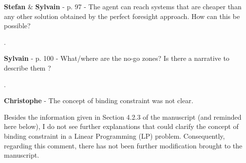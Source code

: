 \documentclass[12pt,a4paper]{article}
\begin{document}
\begin{mdframed}[style=comment] %
{\color{teal} \textbf{Stefan}} \& {\color{purple} \textbf{Sylvain}} - p. 97 - The agent can reach systems that are cheaper than any other solution obtained by the perfect foresight approach. How can this be possible?
\end{mdframed}

\noindent {\color{blue} }. 

\begin{mdframed}[style=manuscript] %

\end{mdframed}

\begin{mdframed}[style=comment] %
{\color{purple} \textbf{Sylvain}} - p. 100 - What/where are the no-go zones? Is there a narrative to describe them ?
\end{mdframed}

\noindent  {\color{blue} }. 

\begin{mdframed}[style=manuscript] %

\end{mdframed}

\begin{mdframed}[style=comment] %
{\color{violet} \textbf{Christophe}} - The concept of binding constraint was not clear.
\end{mdframed}

\noindent
Besides the information given in Section 4.2.3 of the manuscript (and reminded here below), I do not see further explanations that could clarify the concept of binding constraint in a Linear Programming (LP) problem. Consequently, regarding this comment, there has not been further modification brought to the manuscript.
\end{document}
